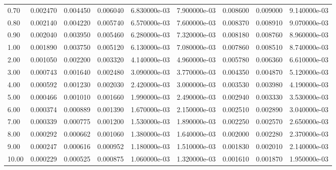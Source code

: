\begin{tabular}{lrrrrrrrr}
0.70  &  0.002470 &  0.004450 &  0.006040 &  6.830000e-03 &  7.900000e-03 &  0.008600 &  0.009000 &  9.140000e-03 \\
0.80  &  0.002140 &  0.004220 &  0.005740 &  6.570000e-03 &  7.600000e-03 &  0.008370 &  0.008910 &  9.070000e-03 \\
0.90  &  0.002040 &  0.003950 &  0.005460 &  6.280000e-03 &  7.320000e-03 &  0.008180 &  0.008760 &  8.960000e-03 \\
1.00  &  0.001890 &  0.003750 &  0.005120 &  6.130000e-03 &  7.080000e-03 &  0.007860 &  0.008510 &  8.740000e-03 \\
2.00  &  0.001050 &  0.002200 &  0.003320 &  4.140000e-03 &  4.960000e-03 &  0.005780 &  0.006360 &  6.610000e-03 \\
3.00  &  0.000743 &  0.001640 &  0.002480 &  3.090000e-03 &  3.770000e-03 &  0.004350 &  0.004870 &  5.120000e-03 \\
4.00  &  0.000592 &  0.001230 &  0.002030 &  2.420000e-03 &  3.000000e-03 &  0.003530 &  0.003980 &  4.190000e-03 \\
5.00  &  0.000466 &  0.001010 &  0.001660 &  1.990000e-03 &  2.490000e-03 &  0.002940 &  0.003330 &  3.530000e-03 \\
6.00  &  0.000374 &  0.000889 &  0.001390 &  1.670000e-03 &  2.150000e-03 &  0.002510 &  0.002890 &  3.040000e-03 \\
7.00  &  0.000339 &  0.000775 &  0.001200 &  1.530000e-03 &  1.890000e-03 &  0.002250 &  0.002570 &  2.650000e-03 \\
8.00  &  0.000292 &  0.000662 &  0.001060 &  1.380000e-03 &  1.640000e-03 &  0.002000 &  0.002280 &  2.370000e-03 \\
9.00  &  0.000247 &  0.000616 &  0.000952 &  1.180000e-03 &  1.510000e-03 &  0.001830 &  0.002010 &  2.140000e-03 \\
10.00 &  0.000229 &  0.000525 &  0.000875 &  1.060000e-03 &  1.320000e-03 &  0.001610 &  0.001870 &  1.950000e-03 \\
\bottomrule
\end{tabular}
